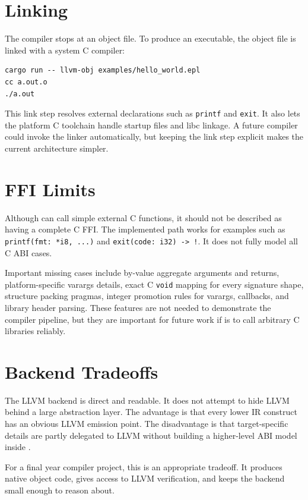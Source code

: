 \section{Linking}

The compiler stops at an object file. To produce an executable, the object file
is linked with a system C compiler:

\begin{lstlisting}[caption={Compiling and linking an EPL program}]
cargo run -- llvm-obj examples/hello_world.epl
cc a.out.o
./a.out
\end{lstlisting}

This link step resolves external declarations such as \texttt{printf} and
\texttt{exit}. It also lets the platform C toolchain handle startup files and
libc linkage. A future compiler could invoke the linker automatically, but
keeping the link step explicit makes the current architecture simpler.

\section{FFI Limits}

Although \epl{} can call simple external C functions, it should not be described
as having a complete C FFI. The implemented path works for examples such as
\texttt{printf(fmt: *i8, ...)} and \texttt{exit(code: i32) -> !}. It does not
fully model all C ABI cases.

Important missing cases include by-value aggregate arguments and returns,
platform-specific varargs details, exact C \texttt{void} mapping for every
signature shape, structure packing pragmas, integer promotion rules for
varargs, callbacks, and library header parsing. These features are not needed to
demonstrate the compiler pipeline, but they are important for future work if
\epl{} is to call arbitrary C libraries reliably.

\section{Backend Tradeoffs}

The LLVM backend is direct and readable. It does not attempt to hide LLVM behind
a large abstraction layer. The advantage is that every lower IR construct has an
obvious LLVM emission point. The disadvantage is that target-specific details
are partly delegated to LLVM without building a higher-level ABI model inside
\epl{}.

For a final year compiler project, this is an appropriate tradeoff. It produces
native object code, gives access to LLVM verification, and keeps the backend
small enough to reason about.
